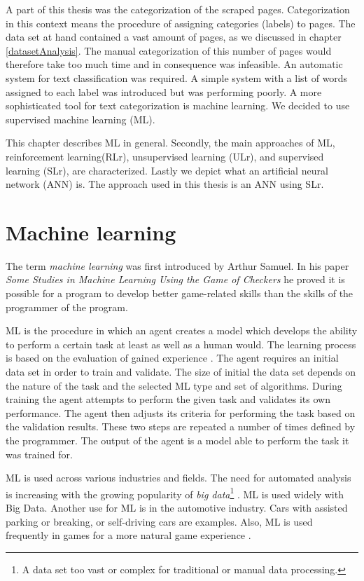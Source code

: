 \label{machineLearning}
A part of this thesis was the categorization of the scraped pages. Categorization in this context means the procedure of assigning categories (labels) to pages. The data set at hand contained a vast amount of pages, as we discussed in chapter \ref{datasetAnalysis}. The manual categorization of this number of pages would therefore take too much time and in consequence was infeasible. An automatic system for text classification was required. A simple system with a list of words assigned to each label was introduced but was performing poorly. A more sophisticated tool for text categorization is machine learning. We decided to use supervised machine learning (ML).

This chapter describes ML in general. Secondly, the main approaches of ML, reinforcement learning(RLr), unsupervised learning (ULr), and supervised learning (SLr), are characterized. Lastly we depict what an artificial neural network (ANN) is. The approach used in this thesis is an ANN using SLr.
 
\section{Machine learning} \label{machineLearning}
The term \textit{machine learning} was first introduced by Arthur Samuel. In his paper \textit{Some Studies in Machine Learning Using the Game of Checkers} \cite{machineLearningOriginal} he proved it is possible for a program to develop better game-related skills than the skills of the programmer of the program.

ML is the procedure in which an agent creates a model which develops the ability to perform a certain task at least as well as a human would. The learning process is based on the evaluation of gained experience \cite{machineLearningToday}. The agent requires an initial data set in order to train and validate. The size of initial the data set depends on the nature of the task and the selected ML type and set of algorithms. During training the agent attempts to perform the given task and validates its own performance. The agent then adjusts its criteria for performing the task based on the validation results. These two steps are repeated a number of times defined by the programmer. The output of the agent is a model able to perform the task it was trained for. 

ML is used across various industries and fields. The need for automated analysis is increasing with the growing popularity of \textit{big data}\footnote{A data set too vast or complex for traditional or manual data processing.} \cite{bigDataExplained} \cite{bigDataPopularity}. ML is used widely with Big Data. Another use for ML is in the automotive industry. Cars with assisted parking or breaking, or self-driving cars are examples\cite{selfDrivingCars}. Also, ML is used frequently in games for a more natural game experience \cite{machineLearningGaming}. 

